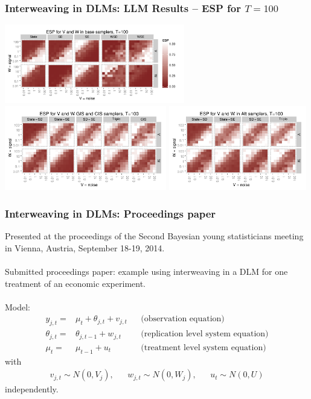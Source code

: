 \documentclass[xcolor=dvipsnames]{beamer}
\begin{document}
\begin{frame}
\frametitle{Interweaving in DLMs: LLM Results -- ESP for $T=100$}
\centering
\includegraphics[width=0.59\textwidth]{../dlmasis/doc/plots/basecisESplot100}\\
\includegraphics[width=0.53\textwidth]{../dlmasis/doc/plots/altintESplotV100}
\includegraphics[width=0.45\textwidth]{../dlmasis/doc/plots/altintESplotW100}
\end{frame}

\begin{frame}
\frametitle{Interweaving in DLMs: Proceedings paper}

Presented at the proceedings of the Second Bayesian young statisticians meeting in Vienna, Austria, September 18-19, 2014.\\~\\

Submitted proceedings paper: example using interweaving in a DLM for one treatment of an economic experiment.\\~\\

\pause Model:
\begin{align*}
y_{j,t} =& \mu_t + \theta_{j,t} + v_{j,t}&&\mbox{(observation equation)} \nonumber\\
\theta_{j,t}=&\theta_{j,t-1} + w_{j,t}&&\mbox{(replication level system equation)}\nonumber\\
\mu_t=&\mu_{t-1} + u_t&&\mbox{(treatment level system equation)}
\end{align*}
with
\begin{align*}
v_{j,t}\sim N(0,V_j), && w_{j,t}\sim N(0,W_j), && u_t\sim N(0,U)
\end{align*}
independently.

\end{frame}
\end{document}
